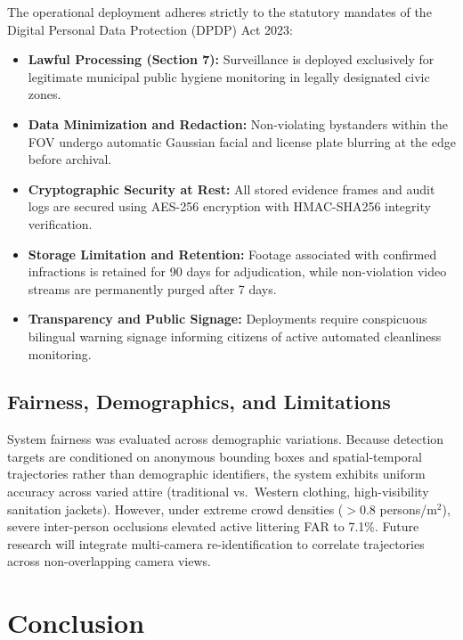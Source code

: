 \documentclass[conference]{IEEEtran}
\begin{document}
The operational deployment adheres strictly to the statutory mandates of the Digital Personal Data Protection (DPDP) Act 2023:
\begin{itemize}
\item \textbf{Lawful Processing (Section 7):} Surveillance is deployed exclusively for legitimate municipal public hygiene monitoring in legally designated civic zones.
\item \textbf{Data Minimization and Redaction:} Non-violating bystanders within the FOV undergo automatic Gaussian facial and license plate blurring at the edge before archival.
\item \textbf{Cryptographic Security at Rest:} All stored evidence frames and audit logs are secured using AES-256 encryption with HMAC-SHA256 integrity verification.
\item \textbf{Storage Limitation and Retention:} Footage associated with confirmed infractions is retained for 90 days for adjudication, while non-violation video streams are permanently purged after 7 days.
\item \textbf{Transparency and Public Signage:} Deployments require conspicuous bilingual warning signage informing citizens of active automated cleanliness monitoring.
\end{itemize}

\subsection{Fairness, Demographics, and Limitations}

System fairness was evaluated across demographic variations. Because detection targets are conditioned on anonymous bounding boxes and spatial-temporal trajectories rather than demographic identifiers, the system exhibits uniform accuracy across varied attire (traditional vs.\ Western clothing, high-visibility sanitation jackets). However, under extreme crowd densities ($> 0.8$ persons/$\text{m}^2$), severe inter-person occlusions elevated active littering FAR to 7.1\%. Future research will integrate multi-camera re-identification to correlate trajectories across non-overlapping camera views.

\section{Conclusion}
\label{sec:conc}
\end{document}
